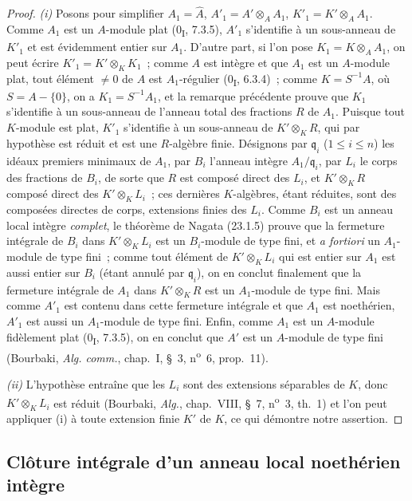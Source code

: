 \begin{proof}
\emph{(i)} Posons pour simplifier $A_1=\widehat A$,
$A'_1=A'\otimes_AA_1$, $K'_1=K'\otimes_AA_1$. Comme $A_1$ est un
$A$-module plat (0\textsubscript{I}, 7.3.5), $A'_1$ s'identifie à un
sous-anneau de $K'_1$ et est évidemment entier sur $A_1$. D'autre part, si
l'on pose $K_1=K\otimes_AA_1$, on peut écrire
$K'_1=K'\otimes_KK_1$~; comme $A$ est intègre et que $A_1$ est un $A$-module
plat, tout élément $\neq0$ de $A$ est $A_1$-régulier
(0\textsubscript{I}, 6.3.4)~; comme $K=S^{-1}A$, où $S=A-\{0\}$, on a
$K_1=S^{-1}A_1$, et la remarque précédente prouve que $K_1$ s'identifie à un
sous-anneau de l'anneau total des fractions $R$ de $A_1$. Puisque tout
$K$-module est plat, $K'_1$ s'identifie à un sous-anneau de $K'\otimes_KR$,
qui par hypothèse est réduit et est une $R$-algèbre finie. Désignons par
$\mathfrak q_i$ ($1\leqslant i\leqslant n$) les idéaux premiers minimaux de
$A_1$, par $B_i$ l'anneau intègre $A_1/\mathfrak q_i$, par $L_i$ le corps des
fractions de $B_i$, de sorte que $R$ est composé direct des $L_i$, et
$K'\otimes_KR$ composé direct des $K'\otimes_KL_i$~; ces dernières
$K$-algèbres, étant réduites, sont des composées directes de corps,
extensions finies des $L_i$. Comme $B_i$ est un anneau local intègre
\emph{complet}, le théorème de Nagata (23.1.5) prouve que la fermeture
intégrale de $B_i$ dans $K'\otimes_KL_i$ est un $B_i$-module de type fini, et
\emph{a fortiori} un $A_1$-module de type fini~; comme tout élément de
$K'\otimes_KL_i$ qui est entier sur $A_1$ est aussi entier sur $B_i$ (étant
annulé par $\mathfrak q_i$), on en conclut finalement que la fermeture
intégrale de $A_1$ dans $K'\otimes_KR$ est un $A_1$-module de type fini. Mais
comme $A'_1$ est contenu dans cette fermeture intégrale et que $A_1$ est
noethérien, $A'_1$ est aussi un $A_1$-module de type fini. Enfin, comme $A_1$
est un $A$-module fidèlement plat (0\textsubscript{I}, 7.3.5), on en conclut
que $A'$ est un $A$-module de type fini (Bourbaki, \emph{Alg. comm.},
chap.~I, §~3, n\textsuperscript{o}~6, prop.~11).


\emph{(ii)} L'hypothèse entraîne que les $L_i$ sont des extensions séparables
de $K$, donc $K'\otimes_KL_i$ est réduit (Bourbaki, \emph{Alg.}, chap.~VIII,
§~7, n\textsuperscript{o}~3, th.~1) et l'on peut appliquer (i) à toute
extension finie $K'$ de $K$, ce qui démontre notre assertion.
\end{proof}

\subsection{Clôture intégrale d'un anneau local noethérien intègre}
\label{subsection:0.23.2-fr}

